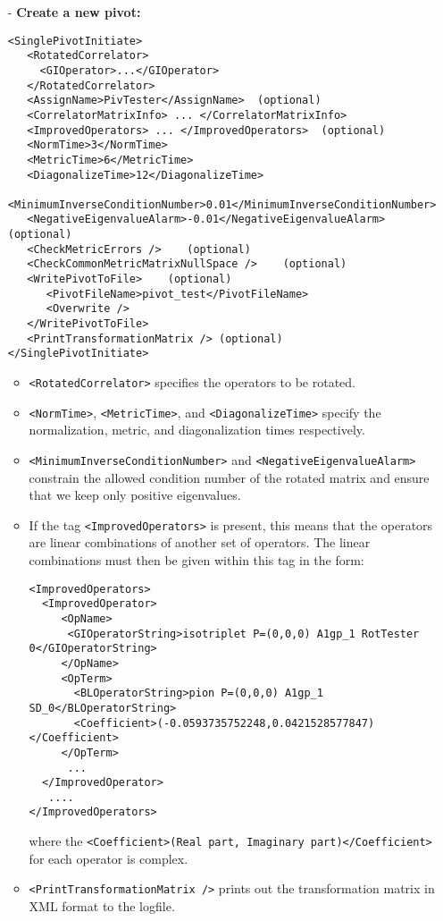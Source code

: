 \documentclass[12pt]{article}
\newcommand{\vb}{\texttt}
\begin{document}
\begin{itemize}
\item[-] \textbf{Create a new pivot:}
\begin{verbatim}
<SinglePivotInitiate>
   <RotatedCorrelator>
     <GIOperator>...</GIOperator>
   </RotatedCorrelator>
   <AssignName>PivTester</AssignName>  (optional)
   <CorrelatorMatrixInfo> ... </CorrelatorMatrixInfo>
   <ImprovedOperators> ... </ImprovedOperators>  (optional)
   <NormTime>3</NormTime>
   <MetricTime>6</MetricTime>
   <DiagonalizeTime>12</DiagonalizeTime>
   <MinimumInverseConditionNumber>0.01</MinimumInverseConditionNumber>
   <NegativeEigenvalueAlarm>-0.01</NegativeEigenvalueAlarm>  (optional)
   <CheckMetricErrors />    (optional)
   <CheckCommonMetricMatrixNullSpace />    (optional)
   <WritePivotToFile>    (optional)
      <PivotFileName>pivot_test</PivotFileName>
      <Overwrite />
   </WritePivotToFile>
   <PrintTransformationMatrix /> (optional)
</SinglePivotInitiate>
\end{verbatim}
\begin{itemize}
\item \vb{<RotatedCorrelator>} specifies the operators to be rotated.
\item \vb{<NormTime>}, \vb{<MetricTime>}, and \vb{<DiagonalizeTime>} specify the normalization,
  metric, and diagonalization times respectively.
\item \vb{<MinimumInverseConditionNumber>} and \vb{<NegativeEigenvalueAlarm>} constrain the allowed
  condition number of the rotated matrix and ensure that we keep only positive eigenvalues.
\item If the tag \vb{<ImprovedOperators>} is present, this means that the operators are linear
combinations of another set of operators. The linear combinations must then
be given within this tag in the form:
\begin{verbatim}
<ImprovedOperators>
  <ImprovedOperator>
     <OpName>
      <GIOperatorString>isotriplet P=(0,0,0) A1gp_1 RotTester 0</GIOperatorString>
     </OpName>
     <OpTerm>
       <BLOperatorString>pion P=(0,0,0) A1gp_1 SD_0</BLOperatorString>
       <Coefficient>(-0.0593735752248,0.0421528577847)</Coefficient>
     </OpTerm>
      ...
  </ImprovedOperator>
   ....
</ImprovedOperators>
\end{verbatim}
where the \vb{<Coefficient>(Real part, Imaginary part)</Coefficient>} for each operator is complex.
\item \vb{<PrintTransformationMatrix />} prints out the transformation matrix in XML format to the logfile.
\end{itemize}


\end{itemize}
\end{document}
